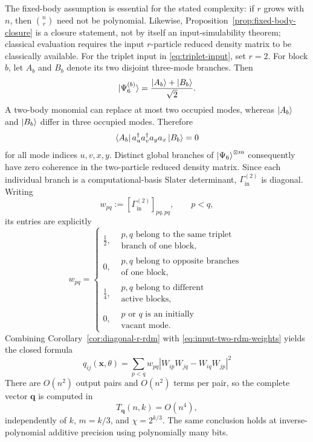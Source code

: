 \documentclass[10pt,twocolumn]{article}
\theoremstyle{plain}
\begin{document}
The fixed-body assumption is essential for the stated complexity:
if \(r\) grows with \(n\), then \(\binom nr\) need not be polynomial.
Likewise, Proposition~\ref{prop:fixed-body-closure} is a closure
statement, not by itself an input-simulability theorem; classical
evaluation requires the input \(r\)-particle reduced density matrix to
be classically available.
For the triplet input in \eqref{eq:triplet-input}, set \(r=2\).
For block \(b\), let \(A_b\) and \(B_b\) denote its two disjoint
three-mode branches. Then
\[
\ket{\Psi_6^{(b)}}
=
\frac{\ket{A_b}+\ket{B_b}}{\sqrt2}.
\]
A two-body monomial can replace at most two occupied modes, whereas
\(\ket{A_b}\) and \(\ket{B_b}\) differ in three occupied modes.
Therefore
\[
\bra{A_b}
a_u^\dagger a_v^\dagger a_y a_x
\ket{B_b}
=
0
\]
for all mode indices \(u,v,x,y\). Distinct global branches of
\(\ket{\Psi_6}^{\otimes m}\) consequently have zero coherence in the
two-particle reduced density matrix. Since each individual branch is
a computational-basis Slater determinant,
\(\Gamma_{\mathrm{in}}^{(2)}\) is diagonal. Writing
\[
w_{pq}
:=
[\Gamma_{\mathrm{in}}^{(2)}]_{pq,pq},
\qquad
p<q,
\]
its entries are explicitly
\begin{equation}
w_{pq}
=
\begin{cases}
\frac12,
&
\substack{
p,q\text{ belong to the same triplet}\\
\text{branch of one block},
}
\\[2mm]
0,
&
\substack{
p,q\text{ belong to opposite branches}\\
\text{of one block},
}
\\[2mm]
\frac14,
&
\substack{
p,q\text{ belong to different}\\
\text{active blocks},
}
\\[2mm]
0,
&
\substack{
p\text{ or }q\text{ is an initially}\\
\text{vacant mode}.
}
\end{cases}
\label{eq:input-two-rdm-weights}
\end{equation}
Combining Corollary~\ref{cor:diagonal-r-rdm} with
\eqref{eq:input-two-rdm-weights} yields the closed formula
\begin{equation}
\boxed{
q_{ij}(\mathbf{x},\theta)
=
\sum_{p<q}
w_{pq}
\left|
W_{ip}W_{jq}-W_{iq}W_{jp}
\right|^2
}
\label{eq:explicit-two-body-algorithm}
\end{equation}
There are \(O(n^2)\) output pairs and \(O(n^2)\) terms per pair, so
the complete vector \(\mathbf q\) is computed in
\begin{equation}
\boxed{
T_{\mathbf q}(n,k)=O(n^4),
}
\label{eq:two-body-complexity}
\end{equation}
independently of \(k\), \(m=k/3\), and
\(\chi=2^{k/3}\). The same conclusion holds at inverse-polynomial
additive precision using polynomially many bits.
\end{document}
